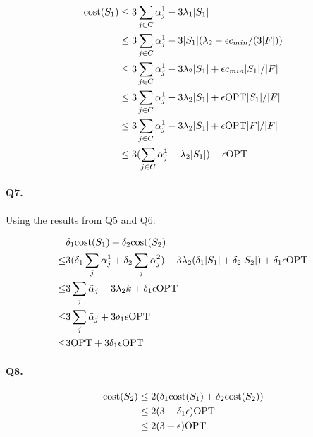 \documentclass{article}
\begin{document}
\begin{align*}
  \text{cost}(S_1) &\le 3 \sum_{j \in C} \alpha^1_j - 3 \lambda_1 |S_1| \\
             &\le 3 \sum_{j \in C} \alpha^1_j - 3 |S_1| (\lambda_2 - \epsilon c_{min} / (3|F|))  \\
             &\le 3 \sum_{j \in C} \alpha^1_j - 3 \lambda_2 |S_1| + \epsilon c_{min} |S_1| / |F|  \\
             &\le 3 \sum_{j \in C} \alpha^1_j - 3 \lambda_2 |S_1| + \epsilon \text{OPT}  |S_1| / |F|\\
             &\le 3 \sum_{j \in C} \alpha^1_j - 3 \lambda_2 |S_1| + \epsilon \text{OPT}  |F| / |F|\\
             &\le 3 (\sum_{j \in C} \alpha^1_j - \lambda_2 |S_1|) + \epsilon \text{OPT}
\end{align*}

\paragraph{Q7. }

Using the results from Q5 and Q6:

\begin{align*}
      & \delta_1 \text{cost}(S_1) + \delta_2 \text{cost}(S_2) \\
  \le & 3(\delta_1 \sum_j \alpha^1_j + \delta_2 \sum_j \alpha^2_j) - 3 \lambda_2 (\delta_1 |S_1| + \delta_2 |S_2|) + \delta_1 \epsilon \text{OPT} \\
  \le & 3 \sum_j \tilde{\alpha}_j - 3\lambda_2 k + \delta_1 \epsilon \text{OPT} \\
  \le & 3 \sum_j \tilde{\alpha}_j + 3 \delta_1 \epsilon \text{OPT} \\
  \le & 3 \text{OPT} + 3 \delta_1 \epsilon \text{OPT} \\
\end{align*}

\paragraph{Q8. }

\begin{align*}
  \text{cost}(S_2) & \le 2 (\delta_1 \text{cost}(S_1) + \delta_2 \text{cost}(S_2)) \\
             & \le 2(3+\delta_1 \epsilon) \text{OPT} \\
             & \le 2(3+\epsilon) \text{OPT} \\
\end{align*}
\end{document}
